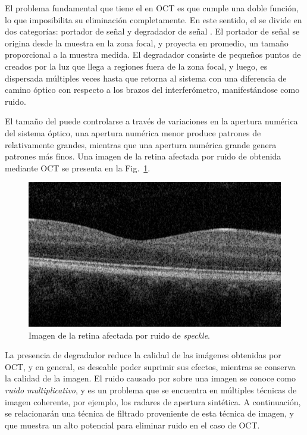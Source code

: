 El problema fundamental que tiene el \speckle en OCT es que cumple una doble función, lo que imposibilita su eliminación completamente. En este sentido, el \speckle se divide en dos categorías: \speckle portador de señal y \speckle degradador de señal \cite{Schmitt1999}. El \speckle portador de señal se origina desde la muestra en la zona focal, y proyecta en promedio, un tamaño proporcional a la muestra medida. El \speckle degradador consiste de pequeños puntos de \speckle creados por la luz que llega a regiones fuera de la zona focal, y luego, es dispersada múltiples veces hasta que retorna al sistema con una diferencia de camino óptico con respecto a los brazos del interferómetro, manifestándose como ruido. 

El tamaño del \speckle puede controlarse a través de variaciones en la apertura numérica del sistema óptico, una apertura numérica menor produce patrones de \speckle relativamente grandes, mientras que una apertura numérica grande genera patrones más finos. Una imagen de la retina afectada por ruido de \speckle obtenida mediante OCT se presenta en la Fig.~\ref{fig:Retina_Noisy_Bscan}.

\begin{figure}[ht!]
\centering
\includegraphics[width=0.7\linewidth]{img/chap3/Retina_Noisy_Bscan}
\caption[Imagen de la retina afectada por ruido de \textit{speckle}]{Imagen de la retina afectada por ruido de \textit{speckle}.}
\label{fig:Retina_Noisy_Bscan}
\end{figure}



La presencia de \speckle degradador reduce la calidad de las imágenes obtenidas por OCT, y en general, es deseable poder suprimir sus efectos, mientras se conserva la calidad de la imagen. El ruido causado por \speckle sobre una imagen se conoce como \emph{ruido multiplicativo}, y es un problema que se encuentra en múltiples técnicas de imagen coherente, por ejemplo, los radares de apertura sintética. A continuación, se relacionarán una técnica de filtrado proveniente de esta técnica de imagen, y que muestra un alto potencial para eliminar ruido en el caso de OCT.


